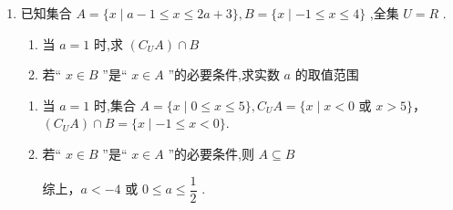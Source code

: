 \begin{enumerate}
\begin{jieda}
        $2 \in B \Longrightarrow q = 6 \Longrightarrow B = \{2, 3\}$，又因为$2 \notin \overline{A} \cap  B$，所以$3 \in A$

        $3 \in A \Longrightarrow p = -7$，故$A = \{3,4\}$

        故$p+q = -1$
    \end{jieda}
    \item 已知集合 $A = \{ x \mid  a - 1 \leq  x \leq  {2a} + 3\} ,B = \{ x \mid   - 1 \leq  x \leq  4\}$ ,全集 $U = R$ .
    \begin{enumerate}
        \item 当 $a = 1$ 时,求 $\left( {{C}_{U}A}\right)  \cap  B$
        \item 若“ $x \in  B$ ”是“ $x \in  A$ ”的必要条件,求实数 $a$ 的取值范围
    \end{enumerate}
    \begin{jieda}
        \begin{enumerate}
            \item 当 $a = 1$ 时,集合 $A = \{ x \mid  0 \leq  x \leq  5\} ,{C}_{U}A = \{ x \mid  x < 0$ 或 $x > 5\}$，$\left( {{C}_{U}A}\right)  \cap  B = \{ x \mid   - 1 \leq  x < 0\} .$
            
            \item 若“ $x \in  B$ ”是“ $x \in  A$ ”的必要条件,则 $A \subseteq  B$
            综上，$a <  - 4$ 或 $0 \leq  a \leq  \dfrac{1}{2}$ .
        \end{enumerate}
    \end{jieda}
\end{enumerate}
\clearpage
